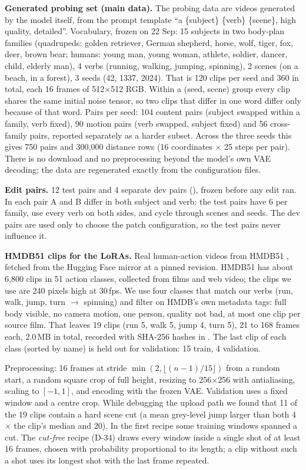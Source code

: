 \documentclass[twoside,english]{article}
\begin{document}
\textbf{Generated probing set (main data).} The probing data are videos generated by the model
itself, from the prompt template ``a \{subject\} \{verb\} \{scene\}, high quality, detailed''.
Vocabulary, frozen on 22 Sep: 15 subjects in two body-plan families (quadrupeds: golden retriever,
German shepherd, horse, wolf, tiger, fox, deer, brown bear; humans: young man, young woman,
athlete, soldier, dancer, child, elderly man), 4 verbs (running, walking, jumping, spinning),
2 scenes (on a beach, in a forest), 3 seeds (42, 1337, 2024). That is 120 clips per seed and
360 in total, each 16 frames of 512$\times$512 RGB. Within a (seed, scene) group every clip
shares the same initial noise tensor, so two clips that differ in one word differ only because
of that word. Pairs per seed: 104 content pairs (subject swapped within a family, verb fixed),
90 motion pairs (verb swapped, subject fixed) and 56 cross-family pairs, reported separately as
a harder subset. Across the three seeds this gives 750 pairs and 300{,}000 distance rows (16
coordinates $\times$ 25 steps per pair). There is no download and no preprocessing beyond the
model's own VAE decoding; the data are regenerated exactly from the configuration files.

\textbf{Edit pairs.} 12 test pairs and 4 separate dev pairs (),
frozen before any edit ran. In each pair A and B differ in both subject and verb; the test pairs
have 6 per family, use every verb on both sides, and cycle through scenes and seeds. The dev
pairs are used only to choose the patch configuration, so the test pairs never influence it.

\textbf{HMDB51 clips for the LoRAs.} Real human-action videos from HMDB51 \citep{kuehne2011hmdb},
fetched from the Hugging Face mirror  \citep{hf_hmdb} at a pinned revision.
HMDB51 has about 6{,}800 clips in 51 action classes, collected from films and web video; the
clips we use are 240 pixels high at 30\,fps. We
use four classes that match our verbs (run, walk, jump, turn $\to$ spinning) and filter on
HMDB's own metadata tags: full body visible, no camera motion, one person, quality not bad, at
most one clip per source film. That leaves 19 clips (run 5, walk 5, jump 4, turn 5), 21 to 168
frames each, 2.0\,MB in total, recorded with SHA-256 hashes in .
The last clip of each class (sorted by name) is held out for validation: 15 train, 4 validation.

Preprocessing: 16 frames at stride $\min(2, \lfloor (n-1)/15 \rfloor)$ from a random start, a random
square crop of full height, resizing to 256$\times$256 with antialiasing, scaling to $[-1,1]$, and
encoding with the frozen VAE. Validation uses a fixed window and a centre crop. While debugging the
upload path we found that 11 of the 19 clips contain a hard scene cut (a mean grey-level jump
larger than both 4$\times$ the clip's median and 20). In the first recipe some training windows
spanned a cut. The \emph{cut-free} recipe (D-34) draws every window inside a single shot of at
least 16 frames, chosen with probability proportional to its length; a clip without such a shot
uses its longest shot with the last frame repeated.
\end{document}
